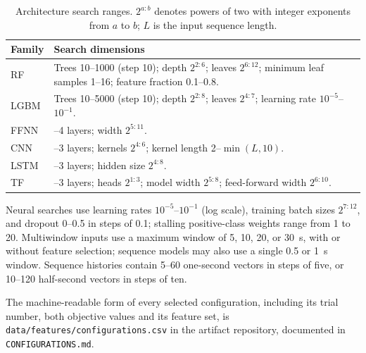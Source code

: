 \documentclass[10pt,a4paper]{article}
\begin{document}
\begin{table}[H]
\centering
\caption{Architecture search ranges. $2^{a:b}$ denotes powers of two with integer exponents from
$a$ to $b$; $L$ is the input sequence length.}
\label{tab:appendixsearch}
\footnotesize
\setlength{\tabcolsep}{6pt}
\begin{tabular}{@{}l>{\raggedright\arraybackslash}p{}@{}}
\toprule
Family & Search dimensions \\
\midrule
RF & Trees 10--1000 (step 10); depth $2^{2:6}$; leaves $2^{6:12}$; minimum leaf samples 1--16; feature fraction 0.1--0.8. \\
LGBM & Trees 10--5000 (step 10); depth $2^{2:8}$; leaves $2^{4:7}$; learning rate $10^{-5}$--$10^{-1}$. \\
FFNN & 1--4 layers; width $2^{5:11}$. \\
CNN & 1--3 layers; kernels $2^{4:6}$; kernel length 2--$\min(L,10)$. \\
LSTM & 1--3 layers; hidden size $2^{4:8}$. \\
TF & 1--3 layers; heads $2^{1:3}$; model width $2^{5:8}$; feed-forward width $2^{6:10}$. \\
\bottomrule
\end{tabular}
\end{table}

Neural searches use learning rates $10^{-5}$--$10^{-1}$ (log scale), training batch sizes
$2^{7:12}$, and dropout 0--0.5 in steps of 0.1; stalling positive-class weights range from 1 to
20. Multiwindow inputs use a maximum window of 5, 10, 20, or \SI{30}{\second}, with or without
feature selection; sequence models may also use a single 0.5 or \SI{1}{\second} window. Sequence
histories contain 5--60 one-second vectors in steps of five, or 10--120 half-second vectors in
steps of ten.

The machine-readable form of every selected configuration, including its trial number, both
objective values and its feature set, is \texttt{data/features/configurations.csv} in the
artifact repository, documented in \texttt{CONFIGURATIONS.md}.
\end{document}
